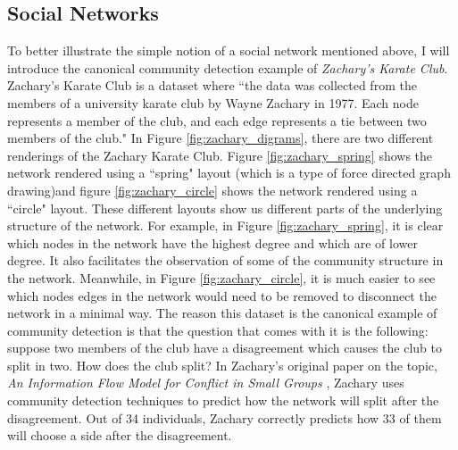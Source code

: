 \subsection{Social Networks}\label{sec:Social Networks}
To better illustrate the simple notion of a social network mentioned above, I will introduce the canonical community detection example of \emph{Zachary's Karate Club}. Zachary's Karate Club is a dataset where ``the data was collected from the members of a university karate club by Wayne Zachary in 1977.  Each node represents a member of the club, and each edge represents a tie between two members of the club." \cite[Metadata]{konect:2017:ucidata-zachary} In Figure \ref{fig:zachary_digrams}, there are two different renderings of the Zachary Karate Club. Figure \ref{fig:zachary_spring} shows the network rendered using a ``spring" layout (which is a type of force directed graph drawing\cite{kobourov12})and figure \ref{fig:zachary_circle} shows the network rendered using a ``circle" layout. These different layouts show us different parts of the underlying structure of the network. For example, in Figure \ref{fig:zachary_spring}, it is clear which nodes in the network have the highest degree and which are of lower degree. It also facilitates the observation of some of the community structure in the network. Meanwhile, in Figure \ref{fig:zachary_circle}, it is much easier to see which nodes edges in the network would need to be removed to disconnect the network in a minimal way. The reason this dataset is the canonical example of community detection is that the question that comes with it is the following: suppose two members of the club have a disagreement which causes the club to split in two. How does the club split? In Zachary's original paper on the topic, \emph{An Information Flow Model for Conflict in Small Groups} \cite{konect:ucidata-zachary}, Zachary uses community detection techniques to predict how the network will split after the disagreement. Out of 34 individuals, Zachary correctly predicts how 33 of them will choose a side after the disagreement.

